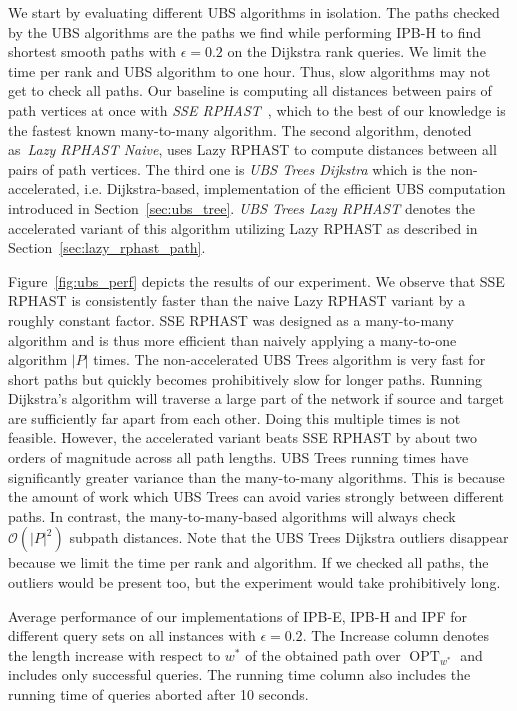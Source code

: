 \documentclass[a4paper,UKenglish,cleveref, autoref, thm-restate]{lipics-v2021}
\newcommand*{\shp}{\operatorname{OPT}}
\begin{document}
We start by evaluating different UBS algorithms in isolation.
The paths checked by the UBS algorithms are the paths we find while performing IPB-H to find shortest smooth paths with $\epsilon = 0.2$ on the Dijkstra rank queries.
We limit the time per rank and UBS algorithm to one hour.
Thus, slow algorithms may not get to check all paths.
Our baseline is computing all distances between pairs of path vertices at once with \emph{SSE RPHAST}~\cite{dgw-fbspr-11}, which to the best of our knowledge is the fastest known many-to-many algorithm.
The second algorithm, denoted as~\emph{Lazy RPHAST Naive}, uses Lazy RPHAST to compute distances between all pairs of path vertices.
The third one is \emph{UBS Trees Dijkstra} which is the non-accelerated, i.e. Dijkstra-based, implementation of the efficient UBS computation introduced in Section~\ref{sec:ubs_tree}.
\emph{UBS Trees Lazy RPHAST} denotes the accelerated variant of this algorithm utilizing Lazy RPHAST as described in Section~\ref{sec:lazy_rphast_path}.

Figure~\ref{fig:ubs_perf} depicts the results of our experiment.
We observe that SSE RPHAST is consistently faster than the naive Lazy RPHAST variant by a roughly constant factor.
SSE RPHAST was designed as a many-to-many algorithm and is thus more efficient than naively applying a many-to-one algorithm $|P|$ times.
The non-accelerated UBS Trees algorithm is very fast for short paths but quickly becomes prohibitively slow for longer paths.
Running Dijkstra's algorithm will traverse a large part of the network if source and target are sufficiently far apart from each other.
Doing this multiple times is not feasible.
However, the accelerated variant beats SSE RPHAST by about two orders of magnitude across all path lengths.
UBS Trees running times have significantly greater variance than the many-to-many algorithms.
This is because the amount of work which UBS Trees can avoid varies strongly between different paths.
In contrast, the many-to-many-based algorithms will always check $\mathcal{O}(|P|^2)$ subpath distances.
Note that the UBS Trees Dijkstra outliers disappear because we limit the time per rank and algorithm.
If we checked all paths, the outliers would be present too, but the experiment would take prohibitively long.

\begin{table}
\centering
\caption{
Average performance of our implementations of IPB-E, IPB-H and IPF for different query sets on all instances with $\epsilon = 0.2$.
The Increase column denotes the length increase with respect to $w^*$ of the obtained path over $\shp_{w^*}$ and includes only successful queries.
The running time column also includes the running time of queries aborted after 10 seconds.
}\label{tab:data}

\end{table}
\end{document}
